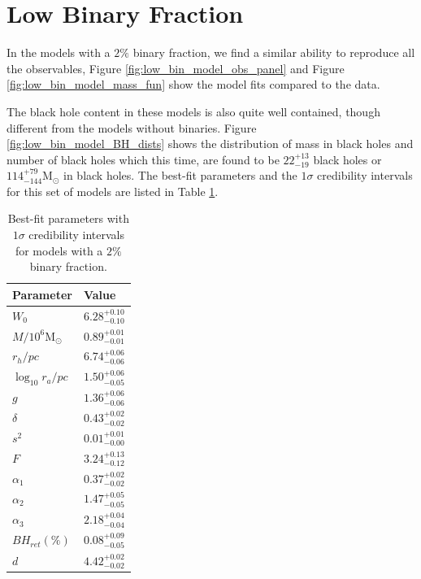 \section{Low Binary Fraction}

In the models with a $2\%$ binary fraction, we find a similar ability to reproduce all the
observables, Figure \ref{fig:low_bin_model_obs_panel} and Figure \ref{fig:low_bin_model_mass_fun}
show the model fits compared to the data.

The black hole content in these models is also quite well contained, though different from the
models without binaries. Figure \ref{fig:low_bin_model_BH_dists} shows the distribution of mass in
black holes and number of black holes which this time, are found to be $22^{+13}_{-19}$ black holes or
$114^{+79}_{-144} \mathrm{M}_\odot$ in black holes. The best-fit parameters and the $1\sigma$ credibility
intervals for this set of models are listed in Table \ref{tab:parameters_lowbin}.


\begin{table}
	\centering
	\caption{Best-fit parameters with $1\sigma$ credibility intervals for models with a $2\%$ binary fraction.}
	\begin{tabular}{l l}

		\hline
		Parameter                 & Value                  \\
		\hline
$W_0$                  & $6.28^{+0.10}_{-0.10}$ \\
		$M/10^6 \mathrm{M}_\odot$ & $0.89^{+0.01}_{-0.01}$ \\
		$r_h / pc$                & $6.74^{+0.06}_{-0.06}$ \\
$\log_{10}{r_a / pc}$     & $1.50^{+0.06}_{-0.05}$ \\
		$g$                       & $1.36^{+0.06}_{-0.06}$ \\
		$\delta$                  & $0.43^{+0.02}_{-0.02}$ \\
		$s^2$                     & $0.01^{+0.01}_{-0.00}$ \\
		$F$                       & $3.24^{+0.13}_{-0.12}$ \\
		$\alpha_1$                & $0.37^{+0.02}_{-0.02}$ \\
		$\alpha_2$                & $1.47^{+0.05}_{-0.05}$ \\
		$\alpha_3$                & $2.18^{+0.04}_{-0.04}$ \\
		$BH_{ret} (\%)$           & $0.08^{+0.09}_{-0.05}$ \\
		$d$                       & $4.42^{+0.02}_{-0.02}$ \\
		\hline
	\end{tabular}
	\label{tab:parameters_lowbin}
\end{table}

